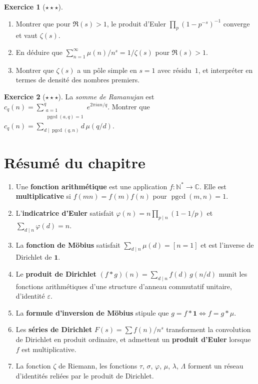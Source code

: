 \documentclass[12pt,a4paper,openany]{book}
\theoremstyle{definition}
\newtheorem{exercice}{Exercice}[chapter]
\theoremstyle{plain}
\theoremstyle{remark}
\newcommand{\N}{\mathbb{N}}
\newcommand{\C}{\mathbb{C}}
\DeclareMathOperator{\pgcd}{pgcd}
\begin{document}
\begin{exercice}[$\star\star\star$]
\label{exo:euler-product-zeta}
\begin{enumerate}[label=(\alph*)]
  \item Montrer que pour $\Re(s) > 1$, le produit d'Euler
    $\prod_p (1-p^{-s})^{-1}$ converge et vaut $\zeta(s)$.
  \item En déduire que $\sum_{n=1}^{\infty} \mu(n)/n^s = 1/\zeta(s)$ pour $\Re(s) > 1$.
  \item Montrer que $\zeta(s)$ a un pôle simple en $s = 1$ avec résidu~$1$, et interpréter
    en termes de densité des nombres premiers.
\end{enumerate}
\end{exercice}

\begin{exercice}[$\star\star\star$]
\label{exo:ramanujan}
La \emph{somme de Ramanujan} est
$c_q(n) = \sum_{\substack{a=1 \\ \pgcd(a,q)=1}}^{q} e^{2\pi i an/q}$.
Montrer que $c_q(n) = \sum_{d \mid \pgcd(q,n)} d\,\mu(q/d)$.
\end{exercice}

\section*{Résumé du chapitre}

\begin{enumerate}[label=\textbf{\arabic*.}]
  \item Une \textbf{fonction arithmétique} est une application $f : \N^* \to \C$. Elle
    est \textbf{multiplicative} si $f(mn) = f(m)f(n)$ pour $\pgcd(m,n) = 1$.
  \item L'\textbf{indicatrice d'Euler} satisfait $\varphi(n) = n\prod_{p \mid n}(1-1/p)$
    et $\sum_{d \mid n} \varphi(d) = n$.
  \item La \textbf{fonction de Möbius} satisfait
    $\sum_{d \mid n} \mu(d) = [n=1]$ et est l'inverse de Dirichlet de $\mathbf{1}$.
  \item Le \textbf{produit de Dirichlet} $(f*g)(n) = \sum_{d \mid n} f(d)\,g(n/d)$ munit
    les fonctions arithmétiques d'une structure d'anneau commutatif unitaire, d'identité
    $\varepsilon$.
  \item La \textbf{formule d'inversion de Möbius} stipule que $g = f * \mathbf{1}
    \Leftrightarrow f = g * \mu$.
  \item Les \textbf{séries de Dirichlet} $F(s) = \sum f(n)/n^s$ transforment la
    convolution de Dirichlet en produit ordinaire, et admettent un \textbf{produit
    d'Euler} lorsque $f$ est multiplicative.
  \item La fonction $\zeta$ de Riemann, les fonctions $\tau$, $\sigma$, $\varphi$, $\mu$,
    $\lambda$, $\Lambda$ forment un réseau d'identités reliées par le produit de Dirichlet.
\end{enumerate}
\end{document}
